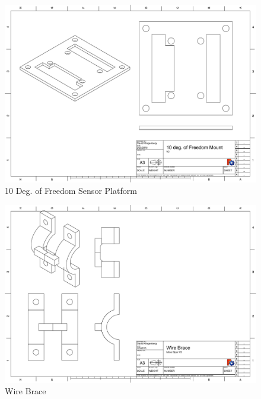 \documentclass[pdftex,11pt]{article}
\begin{document}
\begin{figure}[!h]
	\centering
		\includegraphics[width=1\textwidth]{./graphics/10_DOF_plate-eps-converted-to.pdf}
	\caption{10 Deg. of Freedom Sensor Platform}
	\label{fig:10freedomplatform}
\end{figure}

\begin{figure}[!h]
	\centering
		\includegraphics[width=1\textwidth]{./graphics/wire_brace_lowerclamp-eps-converted-to.pdf}
	\caption{Wire Brace}
	\label{fig:wirebrace}
\end{figure}
\end{document}
